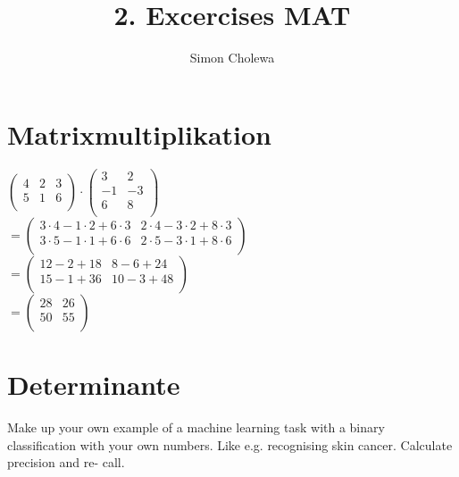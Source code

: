\documentclass[11pt,a4paper]{article}
\author{Simon Cholewa}
\title{2. Excercises MAT}
\begin{document}
\maketitle

\section{Matrixmultiplikation}
$
\left( 
	\begin{array}{rrr}
		4 & 2 & 3 \\
		5 & 1 & 6 \\
	\end{array}
 \right)
 \cdot
 \left(
	\begin{array}{rr}
		3 & 2 \\
		-1 & -3 \\
		6 & 8\\
	\end{array}
\right)$\\
$
=
\left(
	\begin{array}{cc}
		3\cdot4 - 1\cdot2 + 6\cdot3 & 2\cdot4 - 3\cdot2 + 8\cdot3 \\
		3\cdot5 - 1\cdot1 + 6\cdot6 & 2\cdot5 - 3\cdot1 + 8\cdot6 \\
	\end{array}
\right)$\\
$
=
\left(
	\begin{array}{cc}
		12-2+18 & 8-6+24 \\
		15-1+36 & 10-3+48\\
	\end{array}
\right)$\\
$
=
\left(
	\begin{array}{cc}
		28 & 26 \\
		50 & 55 \\
	\end{array}
\right)
$

\section{Determinante}
Make up your own example of a machine learning task with a binary classification
with your own numbers. Like e.g. recognising skin cancer. Calculate precision and re-
call.
\end{document}
